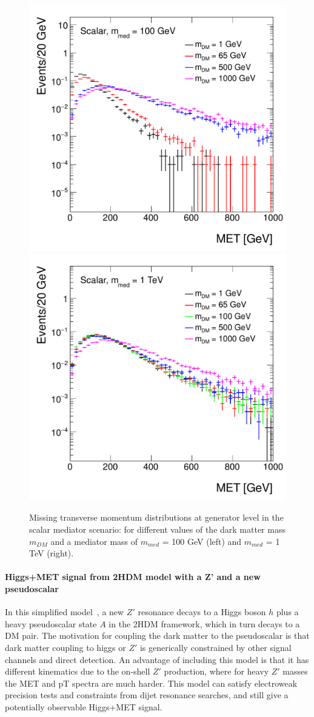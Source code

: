 \begin{figure}[hbpt!]
	\begin{center}
		\includegraphics[width=0.49\linewidth]{figures/EW/monoH/scalar_100_MET_et_Log}
		\includegraphics[width=0.49\linewidth]{figures/EW/monoH/scalar_1000_MET_et_Log}
		\caption{Missing transverse momentum distributions at generator level in the scalar 
			mediator scenario: for different values of the dark matter mass $m_{DM}$ 
			and a mediator mass of $m_{med}$ = 100 GeV (left) and $m_{med}$ = 1 TeV (right).
			\label{fig:metScalarMass}}
	\end{center}
\end{figure}


\paragraph{Higgs+MET signal from 2HDM model with a Z' and a new pseudoscalar}

In this simplified model~\cite{Berlin:2014cfa}, a new $Z'$ resonance decays to a Higgs boson $h$ 
plus a heavy pseudoscalar state 
$A$ in the 2HDM framework, which in turn decays to a DM pair. 
The motivation for coupling the dark matter to the pseudoscalar is that dark matter coupling to higgs or $Z'$ is generically 
constrained by other signal channels and direct detection. 
An advantage of including this model is that it has different kinematics  due to the on-shell $Z'$ production, 
where for heavy $Z'$ masses the MET and pT spectra are much harder.
This model can satisfy electroweak precision tests and constraints from dijet resonance searches, 
and still give a potentially observable Higgs+MET signal.
 
